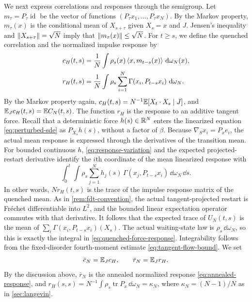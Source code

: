 We next express correlations and responses through the semigroup. Let $m_\tau=P_\tau\operatorname{id}$ be the vector of functions $(P_\tau x_1,\dots,P_\tau x_N)$. By the Markov property, $m_\tau(x)$ is the conditional mean of $X_{s+\tau}$ given $X_s=x$ and $J$. Jensen's inequality and $\lVert X_{s+\tau}\rVert=\sqrt N$ imply that $\lVert m_\tau(x)\rVert\le\sqrt N$. For $t\ge s$, we define the quenched correlation and the normalized impulse response by
\begin{align}
 c_H(t,s)&=\frac1N\int\rho_s(x)\left\langle x,m_{t-s}(x)\right\rangle\,\mathop{}\!\mathrm d\omega_N(x),
 \label{eq:quenched-correlation}\\
 r_H(t,s)&=\frac1N\int\rho_s\sum_{i=1}^N\Gamma(x_i,P_{t-s}x_i)\,\mathop{}\!\mathrm d\omega_N.
 \label{eq:quenched-force-response}
\end{align}
By the Markov property again, $c_H(t,s)=N^{-1}\mathbb E[X_t\cdot X_s\mid J]$, and $\mathbb E_Jc_H(t,s)=\mathbb E C_N(t,s)$. The function $r_H$ is the response to an additive tangent force. Recall that a deterministic force $h(s)\in\mathbb R^N$ enters the linearized equation \eqref{eq:perturbed-sde} as $P_{X_s}h(s)$, without a factor of $\beta$. Because $\nabla_Sx_i=P_xe_i$, the actual mean response is expressed through the derivatives of the transition mean. For bounded continuous $h$, \eqref{eq:response-variation} and the expected projected-restart derivative identify the $i$th coordinate of the mean linearized response with
\[
 \int_0^t\int\rho_s\sum_{j=1}^Nh_j(s)\,\Gamma(x_j,P_{t-s}x_i)\,\dd\omega_N\,\dd s.
\]
In other words, $Nr_H(t,s)$ is the trace of the impulse response matrix of the quenched mean. As in \cref{rem:fdt-convention}, the actual tangent-projected restart is Fr\'echet differentiable into $L^2$, and the bounded linear expectation operator commutes with that derivative. It follows that the expected trace of $U_N(t,s)$ is the mean of $\sum_i\Gamma(x_i,P_{t-s}x_i)(X_s)$. The actual waiting-state law is $\rho_s\,\dd\omega_N$, so this is exactly the integral in \eqref{eq:quenched-force-response}. Integrability follows from the fixed-disorder fourth-moment estimate \eqref{eq:tangent-flow-bound}. We set
\[
 \bar c_N=\mathbb E_Jc_H,\qquad \bar r_N=\mathbb E_Jr_H.
\]
By the discussion above, $\bar r_N$ is the annealed normalized response \eqref{eq:annealed-response}, and $r_H(s,s)=N^{-1}\int\rho_s\operatorname{tr}P_x\,\dd\omega_N=\kappa_N$, where $\kappa_N=(N-1)/N$ as in \cref{sec:langevin}.

